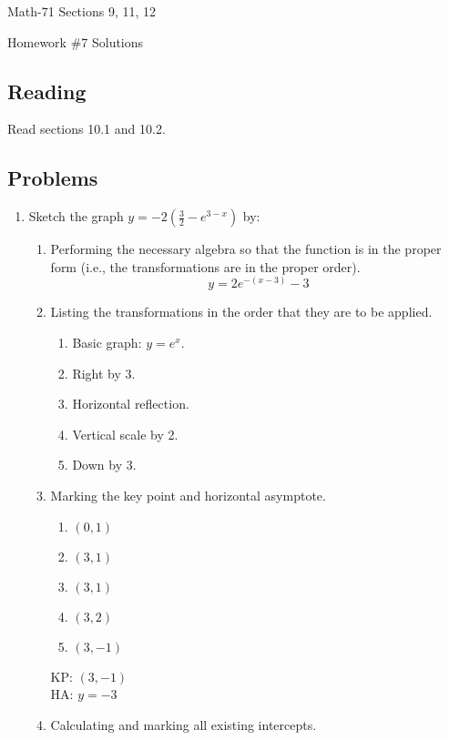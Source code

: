 \documentclass[letterpaper,12pt,fleqn]{article}
\begin{document}
\begin{center}
  \large
  Math-71 Sections 9, 11, 12

  \Large
  Homework \#7 Solutions
\end{center}

\subsection*{Reading}

Read sections 10.1 and 10.2.

\subsection*{Problems}

\begin{enumerate}
\item Sketch the graph \(y=-2\left(\frac{3}{2}-e^{3-x}\right)\) by:
  \begin{enumerate}
  \item Performing the necessary algebra so that the function is in the proper form (i.e., the transformations are in the
    proper order).
    \[y=2e^{-(x-3)}-3\]
  \item Listing the transformations in the order that they are to be applied.
    \begin{enumerate}[label={\arabic*)},start=0]
    \item Basic graph: \(y=e^x\).
    \item Right by 3.
    \item Horizontal reflection.
    \item Vertical scale by 2.
    \item Down by 3.
    \end{enumerate}
  \item Marking the key point and horizontal asymptote.
    \begin{enumerate}[label={\arabic*)},start=0]
    \item \((0,1)\)
    \item \((3,1)\)
    \item \((3,1)\)
    \item \((3,2)\)
    \item \((3,-1)\)
    \end{enumerate}
    KP: \((3,-1)\) \\
    HA: \(y=-3\)
  \item Calculating and marking all existing intercepts.


\end{enumerate}
\end{enumerate}
\end{document}
